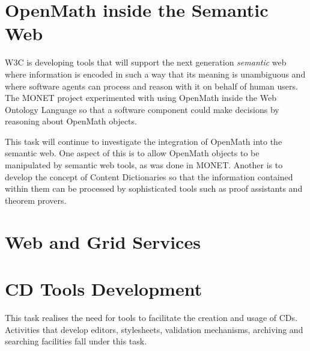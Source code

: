 \documentclass{euproposal}
\begin{document}
\section{OpenMath inside the Semantic Web}

W3C is developing tools that will support the next generation
\emph{semantic} web where information is encoded in such a way that its
meaning is unambiguous and where software agents can process and reason
with it on behalf of human users.  The MONET project experimented with
using OpenMath inside the Web Ontology Language so that a software
component could make decisions by reasoning about OpenMath objects.

This task will continue to investigate the integration of OpenMath into
the semantic web.  One aspect of this is to allow OpenMath objects to be
manipulated by semantic web tools, as was done in MONET.  Another is to
develop the concept of Content Dictionaries so that the information
contained within them can be processed by sophisticated tools such as
proof assistants and theorem provers.

\section{Web and Grid Services}


\section{CD Tools Development} 
\label{tools}

This task realises the need for tools to facilitate the creation and
usage of CDs. Activities that develop editors, stylesheets, validation
mechanisms, archiving and searching facilities fall under this task.
\end{document}
